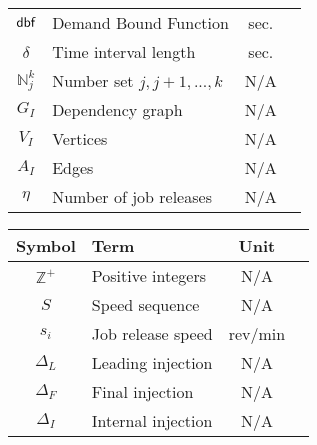 \begin{center}
\begin{tabular}{| c | l | c | c |}
    $\mbox{\sf dbf}$ & Demand Bound Function & sec. \\ \cline{1-3}
    $\delta$ & Time interval length & sec. \\ \cline{1-3}
    $\mathbb{N}_j^k$ & Number set ${j, j+1, ... , k}$& N/A \\ \cline{1-3}
    $G_I$ & Dependency graph & N/A \\ \cline{1-3}
    $V_I$ & Vertices & N/A \\ \cline{1-3}
    $A_I$ & Edges & N/A \\ \cline{1-3}
    $\eta$ & Number of job releases & N/A \\ \cline{1-3}
    \hline  
\end{tabular}
\egroup
\end{center}

\begin{center}
\bgroup
\begin{tabular}{| c | l | c | c |}
    \hline
    Symbol & Term & Unit \\  \hline \hline \cline{1-3}
    $\mathbb{Z}^+$ & Positive integers & N/A \\ \cline{1-3}
    $S$ & Speed sequence & N/A \\ \cline{1-3}
    $s_i$ & Job release speed & rev/min \\ \cline{1-3}
    $\Delta_L$ & Leading injection & N/A \\ \cline{1-3}
    $\Delta_F$ & Final injection & N/A \\ \cline{1-3}
    $\Delta_I$ & Internal injection & N/A \\ \cline{1-3}
    \hline
\end{tabular}
\egroup
\end{center}